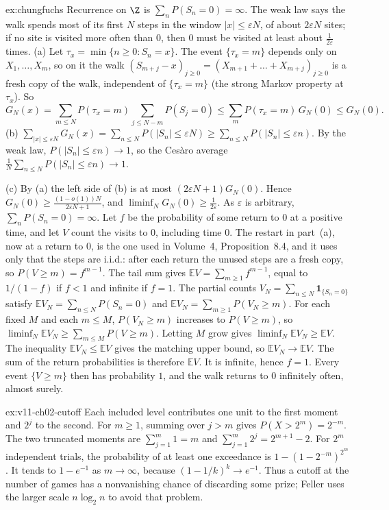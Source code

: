 \begin{solution}{ex:chungfuchs}
\idea Recurrence on $\Z$ is $\sum_nP(S_n=0)=\infty$. The weak law says the walk spends most of its first $N$ steps in the window $|x|\le\varepsilon N$, of
about $2\varepsilon N$ sites; if no site is visited more often than $0$, then $0$ must be visited at least about $\frac1{2\varepsilon}$ times.
\writeup (a) Let $\tau_x=\min\{n\ge0:S_n=x\}$. The event $\{\tau_x=m\}$ depends only on $X_1,\dots,X_m$, so on it the walk $(S_{m+j}-x)_{j\ge0}=(X_{m+1}+\dots+X_{m+j})_{j\ge0}$ is a
fresh copy of the walk, independent of $\{\tau_x=m\}$ (the strong Markov property at $\tau_x$). So
\[
G_N(x)=\sum_{m\le N}P(\tau_x=m)\sum_{j\le N-m}P(S_j=0)\le\sum_mP(\tau_x=m)\,G_N(0)\le G_N(0).
\]
(b) $\sum_{|x|\le\varepsilon N}G_N(x)=\sum_{n\le N}P(|S_n|\le\varepsilon N)\ge\sum_{n\le N}P(|S_n|\le\varepsilon n)$. By the weak law, $P(|S_n|\le\varepsilon n)\to1$,
so the Ces\`aro average $\frac1N\sum_{n\le N}P(|S_n|\le\varepsilon n)\to1$.

(c) By (a) the left side of (b) is at most $(2\varepsilon N+1)G_N(0)$. Hence $G_N(0)\ge\frac{(1-o(1))N}{2\varepsilon N+1}$, and $\liminf_NG_N(0)\ge\frac1{2\varepsilon}$.
As $\varepsilon$ is arbitrary, $\sum_nP(S_n=0)=\infty$. Let $f$ be the probability of some return to $0$ at a positive time, and let $V$ count the visits to $0$, including time $0$. The restart in part~(a), now at a return to $0$, is the one used in Volume~4, Proposition~8.4, and it uses only that the steps are i.i.d.: after each return the unused steps are a fresh copy, so $P(V\ge m)=f^{m-1}$. The tail sum gives $\mathbb EV=\sum_{m\ge1}f^{m-1}$, equal to $1/(1-f)$ if $f<1$ and infinite if $f=1$. The partial counts $V_N=\sum_{n\le N}\mathbf 1_{\{S_n=0\}}$ satisfy $\mathbb EV_N=\sum_{n\le N}P(S_n=0)$ and $\mathbb EV_N=\sum_{m\ge1}P(V_N\ge m)$. For each fixed $M$ and each $m\le M$, $P(V_N\ge m)$ increases to $P(V\ge m)$, so $\liminf_N\mathbb EV_N\ge\sum_{m\le M}P(V\ge m)$. Letting $M$ grow gives $\liminf_N\mathbb EV_N\ge\mathbb EV$. The inequality $\mathbb EV_N\le\mathbb EV$ gives the matching upper bound, so $\mathbb EV_N\to\mathbb EV$. The sum of the return probabilities is therefore $\mathbb EV$. It is infinite, hence $f=1$. Every event $\{V\ge m\}$ then has probability $1$, and the walk returns to $0$ infinitely often, almost surely.
\end{solution}


\begin{solution}{ex:v11-ch02-cutoff}
\idea Each included level contributes one unit to the first moment and $2^j$ to the second.
\writeup For $m\ge1$, summing over $j>m$ gives $P(X>2^m)=2^{-m}$. The two truncated moments are $\sum_{j=1}^m1=m$ and $\sum_{j=1}^m2^j=2^{m+1}-2$. For $2^m$ independent trials, the probability of at least one exceedance is $1-(1-2^{-m})^{2^m}$. It tends to $1-e^{-1}$ as $m\to\infty$, because $(1-1/k)^k\to e^{-1}$. Thus a cutoff at the number of games has a nonvanishing chance of discarding some prize; Feller uses the larger scale $n\log_2 n$ to avoid that problem.
\end{solution}

